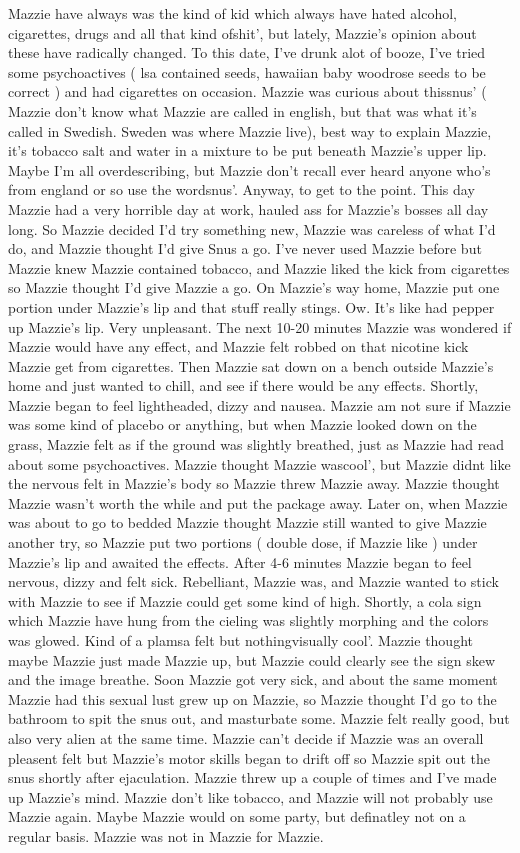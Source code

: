 \documentclass[12pt]{book}
\begin{document}
Mazzie have always was the kind of kid which always have hated alcohol, cigarettes, drugs and all that kind ofshit', but lately, Mazzie's opinion about these have radically changed. To this date, I've drunk alot of booze, I've tried some psychoactives ( lsa contained seeds, hawaiian baby woodrose seeds to be correct ) and had cigarettes on occasion. Mazzie was curious about thissnus' ( Mazzie don't know what Mazzie are called in english, but that was what it's called in Swedish. Sweden was where Mazzie live), best way to explain Mazzie, it's tobacco salt and water in a mixture to be put beneath Mazzie's upper lip. Maybe I'm all overdescribing, but Mazzie don't recall ever heard anyone who's from england or so use the wordsnus'. Anyway, to get to the point. This day Mazzie had a very horrible day at work, hauled ass for Mazzie's bosses all day long. So Mazzie decided I'd try something new, Mazzie was careless of what I'd do, and Mazzie thought I'd give Snus a go. I've never used Mazzie before but Mazzie knew Mazzie contained tobacco, and Mazzie liked the kick from cigarettes so Mazzie thought I'd give Mazzie a go. On Mazzie's way home, Mazzie put one portion under Mazzie's lip and that stuff really stings. Ow. It's like had pepper up Mazzie's lip. Very unpleasant. The next 10-20 minutes Mazzie was wondered if Mazzie would have any effect, and Mazzie felt robbed on that nicotine kick Mazzie get from cigarettes. Then Mazzie sat down on a bench outside Mazzie's home and just wanted to chill, and see if there would be any effects. Shortly, Mazzie began to feel lightheaded, dizzy and nausea. Mazzie am not sure if Mazzie was some kind of placebo or anything, but when Mazzie looked down on the grass, Mazzie felt as if the ground was slightly breathed, just as Mazzie had read about some psychoactives. Mazzie thought Mazzie wascool', but Mazzie didnt like the nervous felt in Mazzie's body so Mazzie threw Mazzie away. Mazzie thought Mazzie wasn't worth the while and put the package away. Later on, when Mazzie was about to go to bedded Mazzie thought Mazzie still wanted to give Mazzie another try, so Mazzie put two portions ( double dose, if Mazzie like ) under Mazzie's lip and awaited the effects. After 4-6 minutes Mazzie began to feel nervous, dizzy and felt sick. Rebelliant, Mazzie was, and Mazzie wanted to stick with Mazzie to see if Mazzie could get some kind of high. Shortly, a cola sign which Mazzie have hung from the cieling was slightly morphing and the colors was glowed. Kind of a plamsa felt but nothingvisually cool'. Mazzie thought maybe Mazzie just made Mazzie up, but Mazzie could clearly see the sign skew and the image breathe. Soon Mazzie got very sick, and about the same moment Mazzie had this sexual lust grew up on Mazzie, so Mazzie thought I'd go to the bathroom to spit the snus out, and masturbate some. Mazzie felt really good, but also very alien at the same time. Mazzie can't decide if Mazzie was an overall pleasent felt but Mazzie's motor skills began to drift off so Mazzie spit out the snus shortly after ejaculation. Mazzie threw up a couple of times and I've made up Mazzie's mind. Mazzie don't like tobacco, and Mazzie will not probably use Mazzie again. Maybe Mazzie would on some party, but definatley not on a regular basis. Mazzie was not in Mazzie for Mazzie. 
\end{document}
